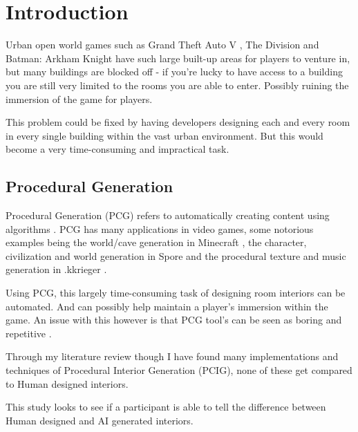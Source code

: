 \section{Introduction}

Urban open world games such as Grand Theft Auto V \cite{game:gta}, The Division \cite{game:division} and Batman: Arkham Knight \cite{game:arkham-knight}
have such large built-up areas for players to venture in, but many buildings are blocked off - 
if you're lucky to have access to a building you are still very limited to the rooms you are able to enter.
Possibly ruining the immersion of the game for players.

This problem could be fixed by having developers designing each and every room in every single building within the vast urban environment.
But this would become a very time-consuming and impractical task.

\subsection*{Procedural Generation}
Procedural Generation (PCG) refers to automatically creating content using algorithms \cite{what-is-pcg}.
PCG has many applications in video games,
some notorious examples being the world/cave generation in Minecraft \cite{game:minecraft},
the character, civilization and world generation in Spore \cite{game:spore}
and the procedural texture and music generation in .kkrieger \cite{game:kkreiger}.

Using PCG, this largely time-consuming task of designing room interiors can be automated. And can possibly help maintain a player's immersion within the game. 
An issue with this however is that PCG tool's can be seen as boring and repetitive \cite{pcg_in_gd}.

Through my literature review though I have found many implementations and techniques of Procedural Interior Generation (PCIG), none of these get compared to Human designed interiors. 
\bigskip

This study looks to see if a participant is able to tell the difference between Human designed and AI generated interiors.

